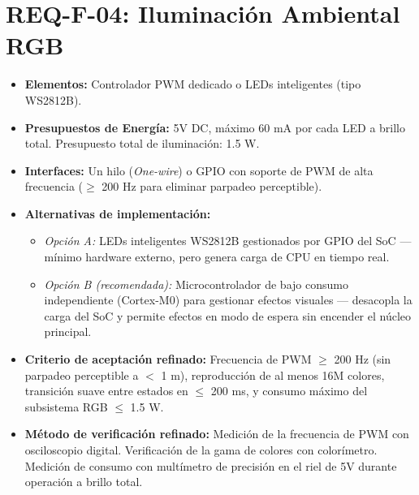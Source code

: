 \documentclass[%
	paper=a4,
	twoside=false,
	parskip=half,
	chapterprefix=false,
	10pt,
	headings=normal,
	bibliography=totoc,
	listof=totoc,
	titlepage=on,
	captions=tableabove,
	draft=false, 
]{scrbook}%
\begin{document}
\section{REQ-F-04: Iluminación Ambiental RGB}
\begin{itemize}
    \item \textbf{Elementos:} Controlador PWM dedicado o LEDs inteligentes (tipo WS2812B).
    \item \textbf{Presupuestos de Energía:} 5V DC, máximo 60 mA por cada LED a brillo total. Presupuesto total de iluminación: 1.5 W.
    \item \textbf{Interfaces:} Un hilo (\textit{One-wire}) o GPIO con soporte de PWM de alta frecuencia ($\geq$ 200 Hz para eliminar parpadeo perceptible).
    \item \textbf{Alternativas de implementación:}
        \begin{itemize}
            \item \textit{Opción A:} LEDs inteligentes WS2812B gestionados por GPIO del SoC — mínimo hardware externo, pero genera carga de CPU en tiempo real.
            \item \textit{Opción B (recomendada):} Microcontrolador de bajo consumo independiente (Cortex-M0) para gestionar efectos visuales — desacopla la carga del SoC y permite efectos en modo de espera sin encender el núcleo principal.
        \end{itemize}
    \item \textbf{Criterio de aceptación refinado:} Frecuencia de PWM $\geq$ 200 Hz (sin parpadeo perceptible a $<$ 1 m), reproducción de al menos 16M colores, transición suave entre estados en $\leq$ 200 ms, y consumo máximo del subsistema RGB $\leq$ 1.5 W.
    \item \textbf{Método de verificación refinado:} Medición de la frecuencia de PWM con osciloscopio digital. Verificación de la gama de colores con colorímetro. Medición de consumo con multímetro de precisión en el riel de 5V durante operación a brillo total.
\end{itemize}

\end{document}
